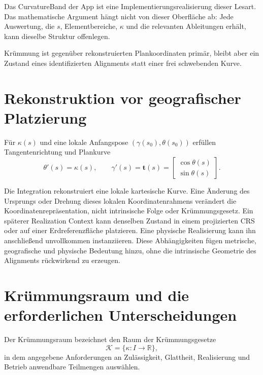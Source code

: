 Das CurvatureBand der App ist eine Implementierungsrealisierung dieser Lesart.
Das mathematische Argument hängt nicht von dieser Oberfläche ab: Jede
Auswertung, die $s$, Elementbereiche, $\kappa$ und die relevanten
Ableitungen erhält, kann dieselbe Struktur offenlegen.

\begin{principle}
\label{princ:curvature-first}
Krümmung ist gegenüber rekonstruierten Plankoordinaten primär, bleibt aber ein
Zustand eines identifizierten Alignments statt einer frei schwebenden Kurve.
\end{principle}

\section{Rekonstruktion vor geografischer Platzierung}

\begin{definition}
\label{def:intrinsic-curvature-reconstruction}
Für $\kappa(s)$ und eine lokale Anfangspose
$(\gamma(s_0),\theta(s_0))$ erfüllen Tangentenrichtung und Plankurve
\[
\theta'(s)=\kappa(s),\qquad
\gamma'(s)=\mathbf t(s)=
\begin{bmatrix}\cos\theta(s)\\\sin\theta(s)\end{bmatrix}.
\]
\end{definition}

Die Integration rekonstruiert eine lokale kartesische Kurve. Eine Änderung
des Ursprungs oder Drehung dieses lokalen Koordinatenrahmens verändert die
Koordinatenrepräsentation, nicht intrinsische Folge oder Krümmungsgesetz. Ein
späterer Realization Context kann denselben Zustand in einem projizierten CRS
oder auf einer Erdreferenzfläche platzieren. Eine physische Realisierung kann
ihn anschließend unvollkommen instanziieren. Diese Abhängigkeiten fügen
metrische, geografische und physische Bedeutung hinzu, ohne die intrinsische
Geometrie des Alignments rückwirkend zu erzeugen.

\section{Krümmungsraum und die erforderlichen Unterscheidungen}

\begin{definition}[Krümmungsraum]
\label{def:curvature-space}
Der Krümmungsraum bezeichnet den Raum der Krümmungsgesetze
\[
\mathcal K=\{\kappa:I\to\mathbb R\},
\]
in dem angegebene Anforderungen an Zulässigkeit, Glattheit, Realisierung und
Betrieb anwendbare Teilmengen auswählen.
\end{definition}

